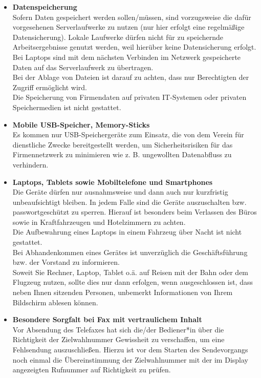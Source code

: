 \documentclass[a4paper, fontsize=11pt]{scrartcl}
\begin{document}
\begin{itemize}
  \item \textbf{Datenspeicherung} \\ Sofern Daten gespeichert werden sollen/müssen, sind vorzugsweise die dafür vorgesehenen Serverlaufwerke zu nutzen (nur hier erfolgt eine regelmäßige Datensicherung). Lokale Laufwerke dürfen nicht für zu speichernde Arbeitsergebnisse genutzt werden, weil hierüber keine Datensicherung erfolgt. Bei Laptops sind mit dem nächsten Verbinden im Netzwerk gespeicherte Daten auf das Serverlaufwerk zu übertragen. \\
  Bei der Ablage von Dateien ist darauf zu achten, dass nur Berechtigten der Zugriff ermöglicht wird. \\
  Die Speicherung von Firmendaten auf privaten IT-Systemen oder privaten Speichermedien ist nicht gestattet.
  \item \textbf{Mobile USB-Speicher, Memory-Sticks} \\ Es kommen nur USB-Speichergeräte zum Einsatz, die von dem Verein für dienstliche Zwecke bereitgestellt werden, um Sicherheitsrisiken für das Firmennetzwerk zu minimieren wie z. B. ungewollten Datenabfluss zu verhindern.
  \item \textbf{Laptops, Tablets sowie Mobiltelefone und Smartphones} \\ Die Geräte dürfen nur ausnahmsweise und dann auch nur kurzfristig unbeaufsichtigt bleiben. In jedem Falle sind die Geräte auszuschalten bzw. passwortgeschützt zu sperren. Hierauf ist besonders beim Verlassen des Büros sowie in Kraftfahrzeugen und Hotelzimmern zu achten.\\
  Die Aufbewahrung eines Laptops in einem Fahrzeug über Nacht ist nicht gestattet.\\
  Bei Abhandenkommen eines Gerätes ist unverzüglich die Geschäftsführung bzw. der Vorstand zu informieren.\\
  Soweit Sie Rechner, Laptop, Tablet o.ä. auf Reisen mit der Bahn oder dem Flugzeug nutzen, sollte dies nur dann erfolgen, wenn ausgeschlossen ist, dass neben Ihnen sitzenden Personen, unbemerkt Informationen von Ihrem Bildschirm ablesen können.
  \item \textbf{Besondere Sorgfalt bei Fax mit vertraulichem Inhalt} \\ Vor Absendung des Telefaxes hat sich die/der Bediener*in über die Richtigkeit der Zielwahlnummer Gewissheit zu verschaffen, um eine Fehlsendung auszuschließen. Hierzu ist vor dem Starten des Sendevorgangs noch einmal die Übereinstimmung der Zielwahlnummer mit der im Display angezeigten Rufnummer auf Richtigkeit zu prüfen. \\

\end{itemize}
\end{document}
